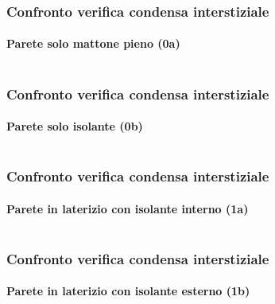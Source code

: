 \documentclass[aspectratio=141,10pt]{beamer}
\begin{document}
\begin{frame}
    \frametitle{Confronto verifica condensa interstiziale}
    \framesubtitle{Parete solo mattone pieno (0a)}
    \begin{columns}
        \begin{column}{0.45\textwidth}
            \resizebox{\textwidth}{!}{%
            
            }
        \end{column}
        \pause
        \begin{column}{0.55\textwidth}
            \scriptsize
            
        \end{column}
    \end{columns}
\end{frame}
\begin{frame}
    \frametitle{Confronto verifica condensa interstiziale}
    \framesubtitle{Parete solo isolante (0b)}
    \begin{columns}
        \begin{column}{0.45\textwidth}
            \resizebox{\textwidth}{!}{%
            
            }
        \end{column}
        \begin{column}{0.55\textwidth}
            \scriptsize
            
        \end{column}
    \end{columns}
\end{frame}
\begin{frame}
    \frametitle{Confronto verifica condensa interstiziale}
    \framesubtitle{Parete in laterizio con isolante interno (1a)}
    \begin{columns}
        \begin{column}{0.45\textwidth}
            \resizebox{\textwidth}{!}{%
            
            }
        \end{column}
        \begin{column}{0.55\textwidth}
            \scriptsize
            
        \end{column}
    \end{columns}
\end{frame}
\begin{frame}
    \frametitle{Confronto verifica condensa interstiziale}
    \framesubtitle{Parete in laterizio con isolante esterno (1b)}
    \begin{columns}
        \begin{column}{0.45\textwidth}
            \resizebox{\textwidth}{!}{%
            
            }
        \end{column}
        \begin{column}{0.55\textwidth}
            \scriptsize
            
        \end{column}
    \end{columns}
\end{frame}
\end{document}
